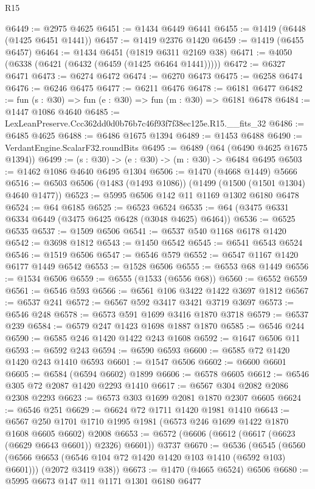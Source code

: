 \begin{lexlean}{R15}
\begin{coremodule}
@6449 := @2975 @4625
@6451 := @1434 @6449 @6441
@6455 := @1419 (@6448 (@1425 @6451 @1441))
@6457 := @1419 @2376 @1420
@6459 := @1419 (@6455 @6457)
@6464 := @1434 @6451 (@1819 @6311 @2169 @38)
@6471 := @4050 (@6338 (@6421 (@6432 (@6459 (@1425 @6464 @1441)))))
@6472 := @6327 @6471
@6473 := @6274 @6472
@6474 := @6270 @6473
@6475 := @6258 @6474
@6476 := @6246 @6475
@6477 := @6211 @6476
@6478 := @6181 @6477
@6482 := fun (s : @30) => fun (e : @30) => fun (m : @30) => @6181 @6478
@6484 := @1447 @1086 @4640
@6485 := LexLeanPreserve.Ccc362dd0d0b76b7c46f93f7f38ec125e.R15.__fits_32
@6486 := @6485 @4625
@6488 := @6486 @1675 @1394
@6489 := @1453 @6488
@6490 := VerdantEngine.ScalarF32.roundBits
@6495 := @6489 (@64 (@6490 @4625 @1675 @1394))
@6499 := (s : @30) -> (e : @30) -> (m : @30) -> @6484 @6495
@6503 := @1462 @1086 @4640 @6495 @1304
@6506 := @1470 (@4668 @1449) @5666
@6516 := @6503 @6506 (@1483 (@1493 @1086)) (@1499 (@1500 (@1501 @1304) @4640 @1477))
@6523 := @5995 @6506 @142 @11 @1169 @1302 @6180 @6478
@6524 := @64 @6185
@6525 := @6523 @6524
@6535 := @64 (@3475 @6331 @6334 @6449 (@3475 @6425 @6428 (@3048 @4625) @6464))
@6536 := @6525 @6535
@6537 := @1509 @6506
@6541 := @6537 @540 @1168 @6178 @1420
@6542 := @3698 @1812
@6543 := @1450 @6542
@6545 := @6541 @6543 @6524
@6546 := @1519 @6506
@6547 := @6546 @579
@6552 := @6547 @1167 @1420 @6177 @1449 @6542
@6553 := @1528 @6506
@6555 := @6553 @68 @1449
@6556 := @1534 @6506
@6559 := @6555 (@1533 (@6556 @68))
@6560 := @6552 @6559
@6561 := @6546 @593
@6566 := @6561 @106 @3422 @1422 @3697 @1812
@6567 := @6537 @241
@6572 := @6567 @592 @3417 @3421 @3719 @3697
@6573 := @6546 @248
@6578 := @6573 @591 @1699 @3416 @1870 @3718
@6579 := @6537 @239
@6584 := @6579 @247 @1423 @1698 @1887 @1870
@6585 := @6546 @244
@6590 := @6585 @246 @1420 @1422 @243 @1608
@6592 := @1647 @6506 @11
@6593 := @6592 @243
@6594 := @6590 @6593
@6600 := @6585 @72 @1420 @1420 @243 @1410 @6593
@6601 := @1547 @6506
@6602 := @6600 @6601
@6605 := @6584 (@6594 @6602) @1899
@6606 := @6578 @6605
@6612 := @6546 @305 @72 @2087 @1420 @2293 @1410
@6617 := @6567 @304 @2082 @2086 @2308 @2293
@6623 := @6573 @303 @1699 @2081 @1870 @2307 @6605
@6624 := @6546 @251
@6629 := @6624 @72 @1711 @1420 @1981 @1410
@6643 := @6567 @250 @1701 @1710 @1995 @1981 (@6573 @246 @1699 @1422 @1870 @1608 @6605 @6602) @2008
@6653 := @6572 (@6606 (@6612 (@6617 (@6623 (@6629 @6643 @6601)) @2326) @6601)) @3737
@6670 := @6536
    (@6545
      (@6560 (@6566 @6653 (@6546 @104 @72 @1420 @1420 @103 @1410 (@6592 @103) @6601)))
      (@2072 @3419 @38))
@6673 := @1470 (@4665 @6524) @6506
@6680 := @5995 @6673 @147 @11 @1171 @1301 @6180 @6477

\end{coremodule}
\end{lexlean}
